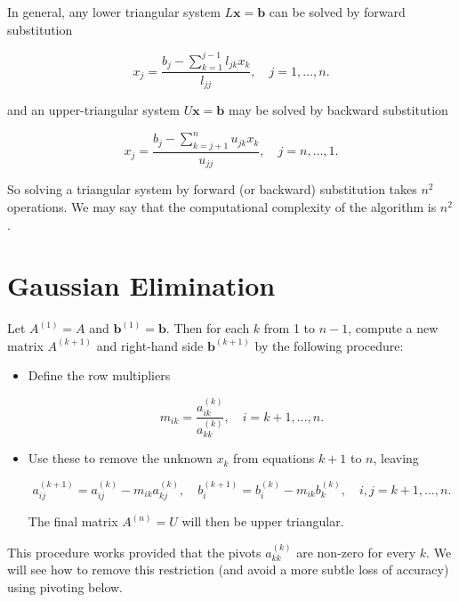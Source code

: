 \begin{lemma}
  In general, any lower triangular system \(L \mathbf{x}=\mathbf{b}\) can be solved by forward substitution

\[
x_j=\frac{b_j-\sum_{k=1}^{j-1} l_{j k} x_k}{l_{j j}}, \quad j=1, \ldots, n .
\]

and an upper-triangular system \(U \mathbf{x}=\mathbf{b}\) may be solved by backward substitution

\[
x_j=\frac{b_j-\sum_{k=j+1}^n u_{j k} x_k}{u_{j j}}, \quad j=n, \ldots, 1 .
\]
\end{lemma}

\begin{remark}
  So solving a triangular system by forward (or backward) substitution takes \(n^2\) operations. We may say that the computational complexity of the algorithm is \(n^2\).
\end{remark}

\section{Gaussian Elimination}

\begin{method}
  Let \(A^{(1)}=A\) and \(\mathbf{b}^{(1)}=\mathbf{b}\). Then for each \(k\) from 1 to \(n-1\), compute a new matrix \(A^{(k+1)}\) and right-hand side \(\mathbf{b}^{(k+1)}\) by the following procedure:
\begin{itemize}
\item[1.] Define the row multipliers

\[
m_{i k}=\frac{a_{i k}^{(k)}}{a_{k k}^{(k)}}, \quad i=k+1, \ldots, n .
\]

\item[2.] Use these to remove the unknown \(x_k\) from equations \(k+1\) to \(n\), leaving

\[
a_{i j}^{(k+1)}=a_{i j}^{(k)}-m_{i k} a_{k j}^{(k)}, \quad b_i^{(k+1)}=b_i^{(k)}-m_{i k} b_k^{(k)}, \quad i, j=k+1, \ldots, n .
\]

The final matrix \(A^{(n)}=U\) will then be upper triangular.
\end{itemize}
\end{method}

\begin{remark}
  This procedure works provided that the pivots \(a_{k k}^{(k)}\) are non-zero for every \(k\). We will see how to remove this restriction (and avoid a more subtle loss of accuracy) using pivoting below.
\end{remark}

